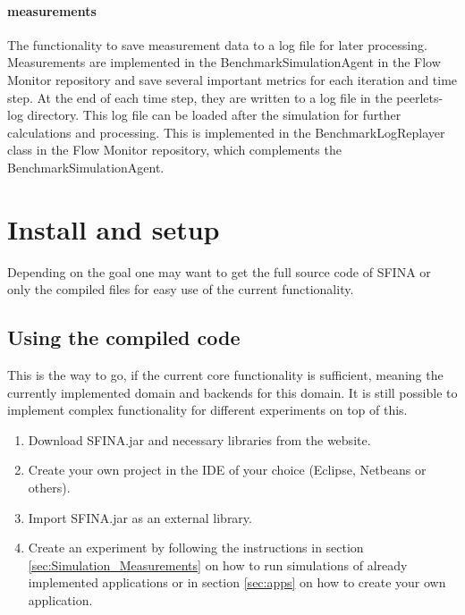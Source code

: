 \documentclass[11pt,fleqn]{book} %
\newcommand{\BenchmarkAgent}{BenchmarkSimulationAgent}
\newcommand{\backend}[1][]{backend#1}
\newcommand{\domain}[1][]{domain#1}
\begin{document}
\paragraph{measurements}
The functionality to save measurement data to a log file for later processing. Measurements are implemented in the \BenchmarkAgent{} in the Flow Monitor repository and save several important metrics for each iteration and time step. At the end of each time step, they are written to a log file in the peerlets-log directory. This log file can be loaded after the simulation for further calculations and processing. This is implemented in the BenchmarkLogReplayer class in the Flow Monitor repository, which complements the \BenchmarkAgent{}.


\section{Install and setup}
Depending on the goal one may want to get the full source code of SFINA or only the compiled files for easy use of the current functionality.

\subsection{Using the compiled code}
This is the way to go, if the current core functionality is sufficient, meaning the currently implemented \domain{} and \backend{s} for this \domain{}. It is still possible to implement complex functionality for different experiments on top of this.

\begin{enumerate}
	\item Download SFINA.jar and necessary libraries from the website.
	\item Create your own project in the IDE of your choice (Eclipse, Netbeans or others).
	\item Import SFINA.jar as an external library.
	\item Create an experiment by following the instructions in section \ref{sec:Simulation_Measurements} on how to run simulations of already implemented applications or in section \ref{sec:apps} on how to create your own application.
\end{enumerate}
\end{document}
